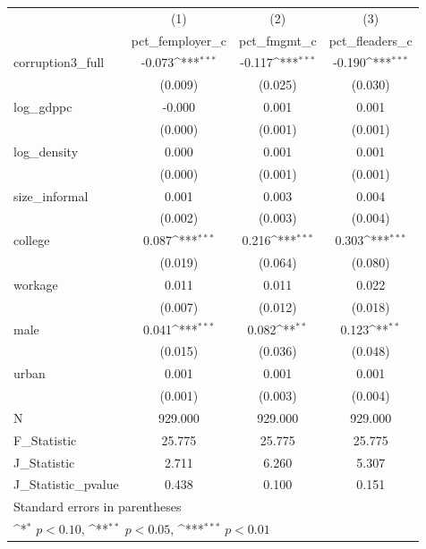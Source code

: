 {
\def\sym#1{\ifmmode^{#1}\else\(^{#1}\)\fi}
\begin{tabular}{l*{3}{c}}
\hline\hline
            &\multicolumn{1}{c}{(1)}&\multicolumn{1}{c}{(2)}&\multicolumn{1}{c}{(3)}\\
            &\multicolumn{1}{c}{pct\_femployer\_c}&\multicolumn{1}{c}{pct\_fmgmt\_c}&\multicolumn{1}{c}{pct\_fleaders\_c}\\
\hline
corruption3\_full&      -0.073\sym{***}&      -0.117\sym{***}&      -0.190\sym{***}\\
            &     (0.009)         &     (0.025)         &     (0.030)         \\
[1em]
log\_gdppc   &      -0.000         &       0.001         &       0.001         \\
            &     (0.000)         &     (0.001)         &     (0.001)         \\
[1em]
log\_density &       0.000         &       0.001         &       0.001         \\
            &     (0.000)         &     (0.001)         &     (0.001)         \\
[1em]
size\_informal&       0.001         &       0.003         &       0.004         \\
            &     (0.002)         &     (0.003)         &     (0.004)         \\
[1em]
college     &       0.087\sym{***}&       0.216\sym{***}&       0.303\sym{***}\\
            &     (0.019)         &     (0.064)         &     (0.080)         \\
[1em]
workage     &       0.011         &       0.011         &       0.022         \\
            &     (0.007)         &     (0.012)         &     (0.018)         \\
[1em]
male        &       0.041\sym{***}&       0.082\sym{**} &       0.123\sym{**} \\
            &     (0.015)         &     (0.036)         &     (0.048)         \\
[1em]
urban       &       0.001         &       0.001         &       0.001         \\
            &     (0.001)         &     (0.003)         &     (0.004)         \\
\hline
N           &     929.000         &     929.000         &     929.000         \\
F\_Statistic &      25.775         &      25.775         &      25.775         \\
J\_Statistic &       2.711         &       6.260         &       5.307         \\
J\_Statistic\_pvalue&       0.438         &       0.100         &       0.151         \\
\hline\hline
\multicolumn{4}{l}{\footnotesize Standard errors in parentheses}\\
\multicolumn{4}{l}{\footnotesize \sym{*} \(p<0.10\), \sym{**} \(p<0.05\), \sym{***} \(p<0.01\)}\\
\end{tabular}
}
